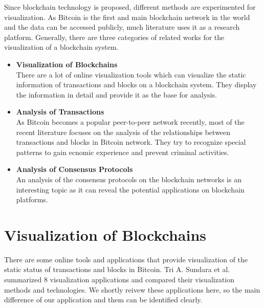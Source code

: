 Since blockchain technology is proposed, different methods are experimented for visualization. As Bitcoin is the first and main blockchain network in the world and the data can be accessed publicly, much literature uses it as a research platform. Generally, there are three categories of related works for the visualization of a blockchain system.
\begin{itemize}
    \item \textbf{Visualization of Blockchains} \\
        There are a lot of online visualization tools which can visualize the static information of transactions and blocks on a blockchain system. They display the information in detail and provide it as the base for analysis.
    \item \textbf{Analysis of Transactions} \\
        As Bitcoin becomes a popular peer-to-peer network recently, most of the recent literature focuses on the analysis of the relationships between transactions and blocks in Bitcoin network. They try to recognize special patterns to gain ecnomic experience and prevent criminal activities.
    \item \textbf{Analysis of Consensus Protocols} \\
        An analysis of the consensus protocols on the blockchain networks is an interesting topic as it can reveal the potential applications on blockchain platforms.
\end{itemize}

\section{Visualization of Blockchains}

There are some online tools and applications that provide visualization of the static status of transactions and blocks in Bitcoin. Tri A. Sundara et al. \cite{Sundara2017} summarized 8 visualization applications and compared their visualization methods and technologies. We shortly reivew these applications here, so the main difference of our application and them can be identified clearly.

